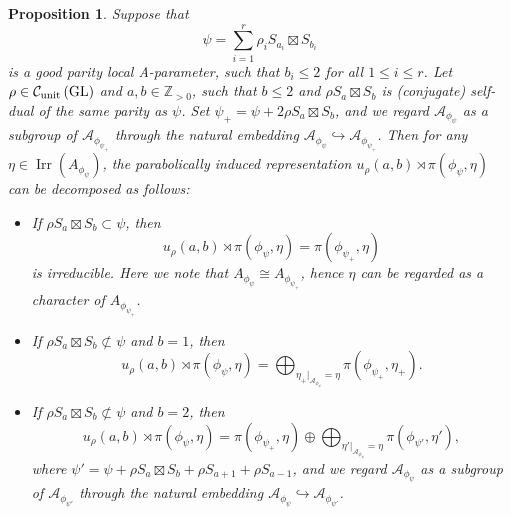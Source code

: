 \documentclass[11pt,letterpaper]{amsart}
\theoremstyle{plain}
\newcounter{theorem}[section]
\numberwithin{theorem}{section}
\numberwithin{equation}{subsection}
\newtheorem{Prop}[theorem]{Proposition}
\theoremstyle{remark}
\newcommand{\GL}{\operatorname{GL}}
\newcommand{\Irr}{\operatorname{Irr}}
\newcommand{\Z}{\mathbb{Z}}
\newcommand{\unit}{{\rm unit}}
\def\calA{\mathcal{A}}
\def\calC{\mathcal{C}}
\begin{document}
\begin{Prop}\label{P:unitaryInd}
Suppose that
\[
    \psi = \sum_{i=1}^r \rho_i S_{a_i}\boxtimes S_{b_i} 
\]
is a good parity local A-parameter, such that $b_i\leq 2$ for all $1\leq i\leq r$. Let $\rho\in\calC_{\unit}\left(\GL\right)$ and $a,b\in\Z_{>0}$, such that $b\leq 2$ and $\rho S_{a}\boxtimes S_b$ is (conjugate) self-dual of the same parity as $\psi$. Set $\psi_+ = \psi + 2\rho S_a\boxtimes S_b$, and we regard $\calA_{\phi_\psi}$ as a subgroup of $\calA_{\phi_{\psi_+}}$ through the natural embedding $\calA_{\phi_\psi}\hookrightarrow\calA_{\phi_{\psi_+}}$.
Then for any $\eta\in\Irr\left(A_{\phi_\psi}\right)$, the parabolically induced representation $u_\rho\left(a,b\right) \rtimes \pi\left(\phi_\psi,\eta\right)$ can be decomposed as follows:
\begin{itemize}
    \item If $\rho S_a\boxtimes S_b \subset \psi$, then
\[
    u_\rho\left(a,b\right) \rtimes \pi\left(\phi_\psi,\eta\right) = \pi\left(\phi_{\psi_+},\eta\right)
\]
    is irreducible. Here we note that $A_{\phi_\psi}\cong A_{\phi_{\psi_+}}$, hence $\eta$ can be regarded as a character of $A_{\phi_{\psi_+}}$.

    \vskip 5pt

    \item If $\rho S_a\boxtimes S_b \not\subset \psi$ and $b=1$, then
    \[
        u_\rho\left(a,b\right) \rtimes \pi\left(\phi_\psi,\eta\right) = \bigoplus_{\eta_+|_{\calA_{\phi_\psi}}=\eta} \pi\left(\phi_{\psi_+},\eta_+\right).
    \] 

    \vskip 5pt

    \item If $\rho S_a\boxtimes S_b \not\subset \psi$ and $b=2$, then
    \[
        u_\rho\left(a,b\right) \rtimes \pi\left(\phi_\psi,\eta\right) = \pi\left(\phi_{\psi_+},\eta\right) \oplus \bigoplus_{\eta'|_{\calA_{\phi_\psi}}=\eta} \pi\left(\phi_{\psi'},\eta'\right),
    \]
    where $\psi' = \psi + \rho S_a\boxtimes S_b + \rho S_{a+1} + \rho S_{a-1}$, and we regard $\calA_{\phi_\psi}$ as a subgroup of $\calA_{\phi_{\psi'}}$ through the natural embedding $\calA_{\phi_\psi}\hookrightarrow\calA_{\phi_{\psi'}}$.
\end{itemize}
\end{Prop}

\vskip 5pt


\end{document}

